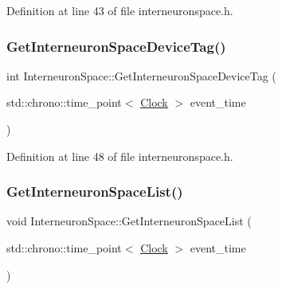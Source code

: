 Definition at line 43 of file interneuronspace.\+h.

\mbox{\label{class_interneuron_space_a66b6683bab6872dfece6111a8ccfb1d7}} 
\subsubsection{\texorpdfstring{Get\+Interneuron\+Space\+Device\+Tag()}{GetInterneuronSpaceDeviceTag()}}
{\footnotesize\ttfamily int Interneuron\+Space\+::\+Get\+Interneuron\+Space\+Device\+Tag (\begin{DoxyParamCaption}\item[{std\+::chrono\+::time\+\_\+point$<$ \hyperlink{universe_8h_a0ef8d951d1ca5ab3cfaf7ab4c7a6fd80}{Clock} $>$}]{event\+\_\+time }\end{DoxyParamCaption})\hspace{0.3cm}{\ttfamily [inline]}}



Definition at line 48 of file interneuronspace.\+h.

\mbox{\label{class_interneuron_space_ae77729a0c140cfb8a9121e898be791b2}} 
\subsubsection{\texorpdfstring{Get\+Interneuron\+Space\+List()}{GetInterneuronSpaceList()}}
{\footnotesize\ttfamily void Interneuron\+Space\+::\+Get\+Interneuron\+Space\+List (\begin{DoxyParamCaption}\item[{std\+::chrono\+::time\+\_\+point$<$ \hyperlink{universe_8h_a0ef8d951d1ca5ab3cfaf7ab4c7a6fd80}{Clock} $>$}]{event\+\_\+time }\end{DoxyParamCaption})}

